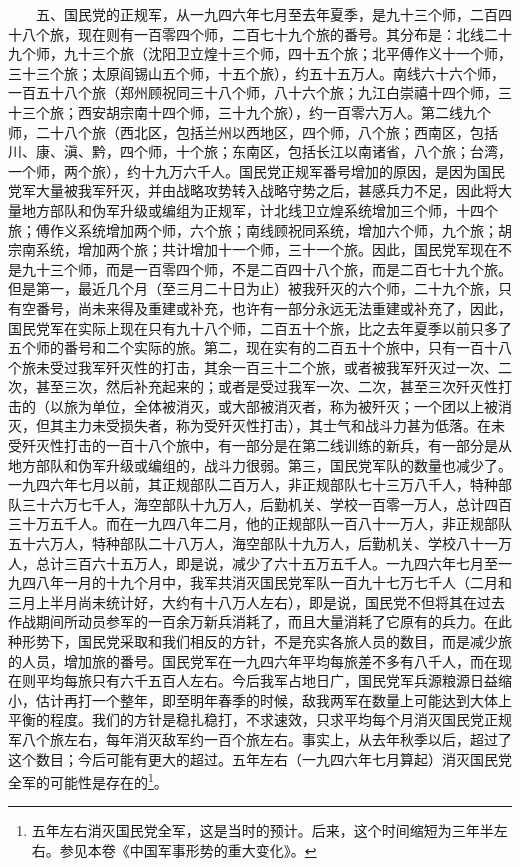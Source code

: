 \documentclass[cn,11pt,chinese]{elegantbook}
\begin{document}
　　五、国民党的正规军，从一九四六年七月至去年夏季，是九十三个师，二百四十八个旅，现在则有一百零四个师，二百七十九个旅的番号。其分布是：北线二十九个师，九十三个旅（沈阳卫立煌十三个师，四十五个旅；北平傅作义十一个师，三十三个旅；太原阎锡山五个师，十五个旅），约五十五万人。南线六十六个师，一百五十八个旅（郑州顾祝同三十八个师，八十六个旅；九江白崇禧十四个师，三十三个旅；西安胡宗南十四个师，三十九个旅），约一百零六万人。第二线九个师，二十八个旅（西北区，包括兰州以西地区，四个师，八个旅；西南区，包括川、康、滇、黔，四个师，十个旅；东南区，包括长江以南诸省，八个旅；台湾，一个师，两个旅），约十九万六千人。国民党正规军番号增加的原因，是因为国民党军大量被我军歼灭，并由战略攻势转入战略守势之后，甚感兵力不足，因此将大量地方部队和伪军升级或编组为正规军，计北线卫立煌系统增加三个师，十四个旅；傅作义系统增加两个师，六个旅；南线顾祝同系统，增加六个师，九个旅；胡宗南系统，增加两个旅；共计增加十一个师，三十一个旅。因此，国民党军现在不是九十三个师，而是一百零四个师，不是二百四十八个旅，而是二百七十九个旅。但是第一，最近几个月（至三月二十日为止）被我歼灭的六个师，二十九个旅，只有空番号，尚未来得及重建或补充，也许有一部分永远无法重建或补充了，因此，国民党军在实际上现在只有九十八个师，二百五十个旅，比之去年夏季以前只多了五个师的番号和二个实际的旅。第二，现在实有的二百五十个旅中，只有一百十八个旅未受过我军歼灭性的打击，其余一百三十二个旅，或者被我军歼灭过一次、二次，甚至三次，然后补充起来的；或者是受过我军一次、二次，甚至三次歼灭性打击的（以旅为单位，全体被消灭，或大部被消灭者，称为被歼灭；一个团以上被消灭，但其主力未受损失者，称为受歼灭性打击），其士气和战斗力甚为低落。在未受歼灭性打击的一百十八个旅中，有一部分是在第二线训练的新兵，有一部分是从地方部队和伪军升级或编组的，战斗力很弱。第三，国民党军队的数量也减少了。一九四六年七月以前，其正规部队二百万人，非正规部队七十三万八千人，特种部队三十六万七千人，海空部队十九万人，后勤机关、学校一百零一万人，总计四百三十万五千人。而在一九四八年二月，他的正规部队一百八十一万人，非正规部队五十六万人，特种部队二十八万人，海空部队十九万人，后勤机关、学校八十一万人，总计三百六十五万人，即是说，减少了六十五万五千人。一九四六年七月至一九四八年一月的十九个月中，我军共消灭国民党军队一百九十七万七千人（二月和三月上半月尚未统计好，大约有十八万人左右），即是说，国民党不但将其在过去作战期间所动员参军的一百余万新兵消耗了，而且大量消耗了它原有的兵力。在此种形势下，国民党采取和我们相反的方针，不是充实各旅人员的数目，而是减少旅的人员，增加旅的番号。国民党军在一九四六年平均每旅差不多有八千人，而在现在则平均每旅只有六千五百人左右。今后我军占地日广，国民党军兵源粮源日益缩小，估计再打一个整年，即至明年春季的时候，敌我两军在数量上可能达到大体上平衡的程度。我们的方针是稳扎稳打，不求速效，只求平均每个月消灭国民党正规军八个旅左右，每年消灭敌军约一百个旅左右。事实上，从去年秋季以后，超过了这个数目；今后可能有更大的超过。五年左右（一九四六年七月算起）消灭国民党全军的可能性是存在的\footnote[7]{ 五年左右消灭国民党全军，这是当时的预计。后来，这个时间缩短为三年半左右。参见本卷《中国军事形势的重大变化》。}。\\
\end{document}
